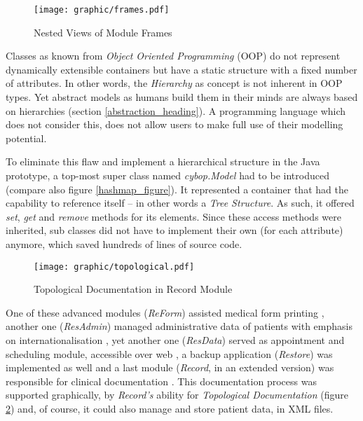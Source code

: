 \begin{figure}[ht]
    \begin{center}
        \texttt{[image: graphic/frames.pdf]}
        \caption{Nested Views of Module Frames}
        \label{frames_figure}
    \end{center}
\end{figure}

Classes as known from \emph{Object Oriented Programming} (OOP) do not represent
dynamically extensible containers but have a static structure with a fixed
number of attributes. In other words, the \emph{Hierarchy} as concept is not
inherent in OOP types. Yet abstract models as humans build them in their minds
are always based on hierarchies (section \ref{abstraction_heading}). A
programming language which does not consider this, does not allow users to make
full use of their modelling potential.

To eliminate this flaw and implement a hierarchical structure in the Java
prototype, a top-most super class named \emph{cybop.Model} had to be introduced
(compare also figure \ref{hashmap_figure}). It represented a container that had
the capability to reference itself -- in other words a \emph{Tree Structure}.
As such, it offered \emph{set}, \emph{get} and \emph{remove} methods for its
elements. Since these access methods were inherited, sub classes did not have
to implement their own (for each attribute) anymore, which saved hundreds of
lines of source code.

\begin{figure}[ht]
    \begin{center}
        \texttt{[image: graphic/topological.pdf]}
        \caption{Topological Documentation in Record Module \cite{bohl}}
        \label{topological_figure}
    \end{center}
\end{figure}

One of these advanced modules (\emph{ReForm}) assisted medical form printing
\cite{kunze2003}, another one (\emph{ResAdmin}) managed administrative data of
patients with emphasis on internationalisation \cite{kanagasabapathi}, yet
another one (\emph{ResData}) served as appointment and scheduling module,
accessible over web \cite{holzmueller2005}, a backup application (\emph{Restore})
was implemented as well \cite{behrendt} and a last module (\emph{Record}, in an
extended version) was responsible for clinical documentation \cite{bohl}. This
documentation process was supported graphically, by \emph{Record's} ability for
\emph{Topological Documentation} (figure \ref{topological_figure}) and, of
course, it could also manage and store patient data, in XML files.

